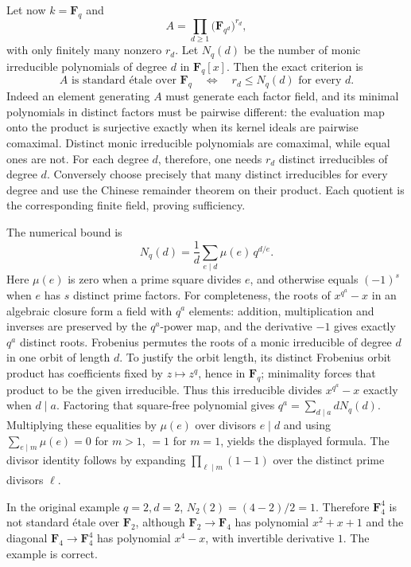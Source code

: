 Let now \(k=\mathbf F_q\) and \[
A=\prod_{d\ge1}\bigl(\mathbf F_{q^d}\bigr)^{r_d},
\] with only finitely many nonzero \(r_d\). Let \(N_q(d)\) be the number of monic irreducible polynomials of degree \(d\) in \(\mathbf F_q[x]\). Then the exact criterion is \[
A\text{ is standard étale over }\mathbf F_q
\quad\Longleftrightarrow\quad
r_d\le N_q(d)\text{ for every }d.
\] Indeed an element generating \(A\) must generate each factor field, and its minimal polynomials in distinct factors must be pairwise different: the evaluation map onto the product is surjective exactly when its kernel ideals are pairwise comaximal. Distinct monic irreducible polynomials are comaximal, while equal ones are not. For each degree \(d\), therefore, one needs \(r_d\) distinct irreducibles of degree \(d\). Conversely choose precisely that many distinct irreducibles for every degree and use the Chinese remainder theorem on their product. Each quotient is the corresponding finite field, proving sufficiency.

The numerical bound is \[
N_q(d)=\frac1d\sum_{e\mid d}\mu(e)\,q^{d/e}.
\] Here \(\mu(e)\) is zero when a prime square divides \(e\), and otherwise equals \((-1)^s\) when \(e\) has \(s\) distinct prime factors. For completeness, the roots of \(x^{q^a}-x\) in an algebraic closure form a field with \(q^a\) elements: addition, multiplication and inverses are preserved by the \(q^a\)-power map, and the derivative \(-1\) gives exactly \(q^a\) distinct roots. Frobenius permutes the roots of a monic irreducible of degree \(d\) in one orbit of length \(d\). To justify the orbit length, its distinct Frobenius orbit product has coefficients fixed by \(z\mapsto z^q\), hence in \(\mathbf F_q\); minimality forces that product to be the given irreducible. Thus this irreducible divides \(x^{q^a}-x\) exactly when \(d\mid a\). Factoring that square-free polynomial gives \(q^a=\sum_{d\mid a}dN_q(d)\). Multiplying these equalities by \(\mu(e)\) over divisors \(e\mid d\) and using \(\sum_{e\mid m}\mu(e)=0\) for \(m>1\), \(=1\) for \(m=1\), yields the displayed formula. The divisor identity follows by expanding \(\prod_{\ell\mid m}(1-1)\) over the distinct prime divisors \(\ell\).

In the original example \(q=2,d=2\), \(N_2(2)=(4-2)/2=1\). Therefore \(\mathbf F_4^4\) is not standard étale over \(\mathbf F_2\), although \(\mathbf F_2\to\mathbf F_4\) has polynomial \(x^2+x+1\) and the diagonal \(\mathbf F_4\to\mathbf F_4^4\) has polynomial \(x^4-x\), with invertible derivative \(1\). The example is correct.


